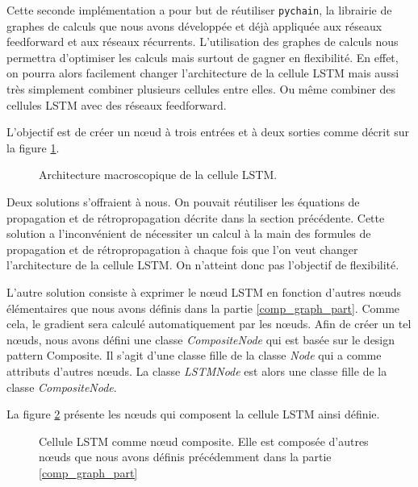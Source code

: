 Cette seconde implémentation a pour but de réutiliser \texttt{pychain}, la librairie de graphes de calculs que nous avons développée et déjà appliquée aux réseaux feedforward et aux réseaux récurrents. L'utilisation des graphes de calculs nous permettra d'optimiser les calculs mais surtout de gagner en flexibilité. En effet, on pourra alors facilement changer l'architecture de la cellule LSTM mais aussi très simplement combiner plusieurs cellules entre elles. Ou même combiner des cellules LSTM avec des réseaux feedforward.

L'objectif est de créer un n\oe{}ud à trois entrées et à deux sorties comme décrit sur la figure \ref{lstm_node_macro}.

\begin{figure}[h!]
\begin{center}

\caption{Architecture macroscopique de la cellule LSTM.}
\label{lstm_node_macro}
\end{center}
\end{figure}

Deux solutions s'offraient à nous. On pouvait réutiliser les équations de propagation et de rétropropagation décrite dans la section précédente. Cette solution a l'inconvénient de nécessiter un calcul à la main des formules de propagation et de rétropropagation à chaque fois que l'on veut changer l'architecture de la cellule LSTM. On n'atteint donc pas l'objectif de flexibilité.

L'autre solution consiste à exprimer le n\oe{}ud LSTM en fonction d'autres n\oe{}uds élémentaires que nous avons définis dans la partie \ref{comp_graph_part}. Comme cela, le gradient sera calculé automatiquement par les n\oe{}uds. Afin de créer un tel n\oe{}uds, nous avons défini une classe \textit{CompositeNode} qui est basée sur le design pattern Composite. Il s'agit d'une classe fille de la classe \textit{Node} qui a comme attributs d'autres n\oe{}uds. La classe \textit{LSTMNode} est alors une classe fille de la classe \textit{CompositeNode}.

La figure \ref{lstm_node_micro} présente les n\oe{}uds qui composent la cellule LSTM ainsi définie.

\begin{figure}[h!]
\begin{center}

\caption{Cellule LSTM comme n\oe{}ud composite. Elle est composée d'autres n\oe{}uds que nous avons définis précédemment dans la partie \ref{comp_graph_part}}
\label{lstm_node_micro}
\end{center}
\end{figure}


